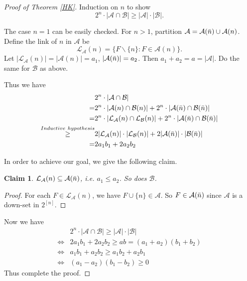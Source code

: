 \documentclass{article}
\newtheorem{claim}[theorem]{Claim}
\theoremstyle{definition}
\begin{document}
\begin{proof}[Proof of Theorem \ref{HK}]
    Induction on $n$ to show $$2^n \cdot |\mathcal{A} \cap \mathcal{B}| \geq |\mathcal{A}| \cdot |\mathcal{B}|.$$

    The case $n=1$ can be easily checked. For $n > 1$, partition $\mathcal{A} = \mathcal{A}(\Bar{n}) \cup \mathcal{A}(n)$.  Define the link of $n$ in $\mathcal{A}$ be $$\mathcal{L}_{\mathcal{A}}(n) = \{F\backslash \{n\}: F \in \mathcal{A}(n) \}.$$
    Let $|\mathcal{L}_{\mathcal{A}}(n)|=|\mathcal{A}(n)|=a_1$, $|\mathcal{A}(\Bar{n})|=a_2$. Then $a_1+a_2=a=|\mathcal{A}|$. Do the same for $\mathcal{B}$ as above.

    Thus we have \begin{equation}\label{equ16-1}
        \begin{split}
            & 2^n \cdot |\mathcal{A} \cap \mathcal{B}| \\
            = & 2^n \cdot |\mathcal{A}(n) \cap \mathcal{B}(n)| + 2^n \cdot |\mathcal{A}(\Bar{n}) \cap \mathcal{B}(\Bar{n})|\\
            = & 2^n \cdot |\mathcal{L}_{\mathcal{A}}(n) \cap \mathcal{L}_{\mathcal{B}}(n)| + 2^n \cdot |\mathcal{A}(\Bar{n}) \cap \mathcal{B}(\Bar{n})|\\
            \overset{Inductive\ hypothesis}{\geq} & 2|\mathcal{L}_{\mathcal{A}}(n)|\cdot |\mathcal{L}_{\mathcal{B}}(n)| + 2|\mathcal{A}(\Bar{n})|\cdot |\mathcal{B}(\Bar{n})|\\
            = & 2a_1b_1+ 2a_2b_2
        \end{split}
    \end{equation}

    In order to achieve our goal, we give the following claim.

    \begin{claim}
        $\mathcal{L}_{\mathcal{A}}(n) \subseteq \mathcal{A}(\Bar{n})$, i.e. $a_1 \leq a_2$. So does $\mathcal{B}$.
    \end{claim}
    \begin{proof}
        For each $F \in \mathcal{L}_{\mathcal{A}}(n)$, we have $F \cup \{n\} \in \mathcal{A}$. So $F \in \mathcal{A}(\Bar{n})$ since $\mathcal{A}$ is a down-set in $2^{[n]}$.
    \end{proof}

    Now we have \begin{equation*}
        \begin{split}
            & 2^n \cdot |\mathcal{A} \cap \mathcal{B}| \geq |\mathcal{A}| \cdot |\mathcal{B}|\\
            \Leftrightarrow & 2a_1b_1+ 2a_2b_2 \geq ab=(a_1+a_2)(b_1+b_2) \\
            \Leftrightarrow & a_1b_1+ a_2b_2 \geq a_1b_2+ a_2b_1 \\
            \Leftrightarrow & (a_1-a_2)(b_1-b_2) \geq 0
        \end{split}
    \end{equation*}
    Thus complete the proof.
\end{proof}
\end{document}
